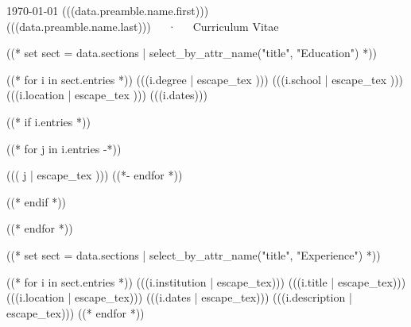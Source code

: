 \documentclass[10pt, letterpaper]{awesome-cv}
\begin{document}
\makecvheader

\makecvfooter
  {\today}
  {(((data.preamble.name.first))) (((data.preamble.name.last)))~~~·~~~Curriculum Vitae}
  {\thepage}



((* set sect = data.sections | select_by_attr_name("title", "Education") *))
\begin{cventries}
((* for i in sect.entries *))
\cventry
  {(((i.degree | escape_tex )))}
  {(((i.school | escape_tex )))}
  {(((i.location | escape_tex )))}
  {(((i.dates)))}
  {((* if i.entries *))
    \begin{cvitems}
    ((* for j in i.entries -*))
    \item ((( j | escape_tex )))
    ((*- endfor *))
    \end{cvitems}
    ((* endif *))}
((* endfor *))
\end{cventries}

((* set sect = data.sections | select_by_attr_name("title", "Experience") *))
\begin{cventries}
((* for i in sect.entries *))
\cventry
  {(((i.institution | escape_tex)))}
  {(((i.title | escape_tex)))}
  {(((i.location | escape_tex)))}
  {(((i.dates | escape_tex)))}
  {(((i.description | escape_tex)))}
((* endfor *))
\end{cventries}
\end{document}
